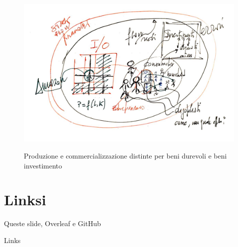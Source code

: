 \documentclass[]{beamer}
\begin{document}
\begin{frame}{~} %



\begin{figure}[H]
\center
\includegraphics[scale=0.50]{7.pdf}
\label{7}
\caption{Produzione e commercializzazione distinte per beni durevoli e beni investimento}
\end{figure}

\end{frame}

\section{Linksi}

\begin{frame}{Queste slide, Overleaf e GitHub}

Links

\end{frame}
\end{document}
